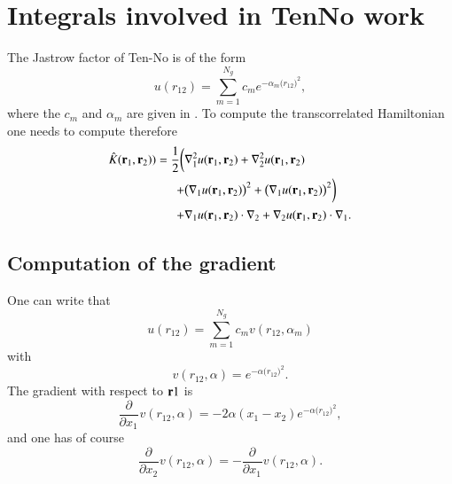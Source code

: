 \documentclass[aip,jcp,reprint,noshowkeys,superscriptaddress]{revtex4-1}
\newcommand{\deriv}[3]{\frac{\partial^{#3} #1}{\partial {#2}^{#3}}}
\newcommand{\br}[0]{{\bf {r}}}
\newcommand{\bri}[1]{{\bf r}_{#1}}
\begin{document}
\section{Integrals involved in TenNo work}
The Jastrow factor of Ten-No is of the form
\begin{equation}
 u(r_{12})=\sum_{m=1}^{N_g} c_m e^{-\alpha_m \big(r_{12}\big)^2},
\end{equation}
where the $c_m$ and $\alpha_m$ are given in \cite{TenNo-CPL-00-a}. 
To compute the transcorrelated Hamiltonian one needs to compute therefore 
\begin{equation}
 \begin{aligned}
 \label{def_k}
  \hat{K}(\bri{1},\bri{2}) ) = \frac{1}{2} \bigg( &\nabla_1^2 u(\bri{1},\bri{2}) + \nabla_2^2u(\bri{1},\bri{2}) \\
                                               + &\big(\nabla_1 u(\bri{1},\bri{2}) \big) ^2 + \big(\nabla_1 u(\bri{1},\bri{2}) \big) ^2 \bigg) \\
                                               + &\nabla_1 u(\bri{1},\bri{2}) \cdot \nabla_2 + \nabla_2 u(\bri{1},\bri{2}) \cdot \nabla_1.
 \end{aligned}
\end{equation}
\subsection{Computation of the gradient}
One can write that 
\begin{equation}
 u(r_{12})=\sum_{m=1}^{N_g} c_m v(r_{12},\alpha_m)
\end{equation}
with 
\begin{equation}
 v(r_{12},\alpha) = e^{-\alpha \big(r_{12}\big)^2}.
\end{equation}
The gradient with respect to $\br{1}$ is 
\begin{equation}
 \deriv{}{x_1}{} v(r_{12},\alpha) = -2 \alpha (x_1 - x_2) e^{-\alpha \big(r_{12}\big)^2},
\end{equation}
and one has of course 
\begin{equation}
 \deriv{}{x_2}{} v(r_{12},\alpha) = - \deriv{}{x_1}{} v(r_{12},\alpha). 
\end{equation}
\end{document}
